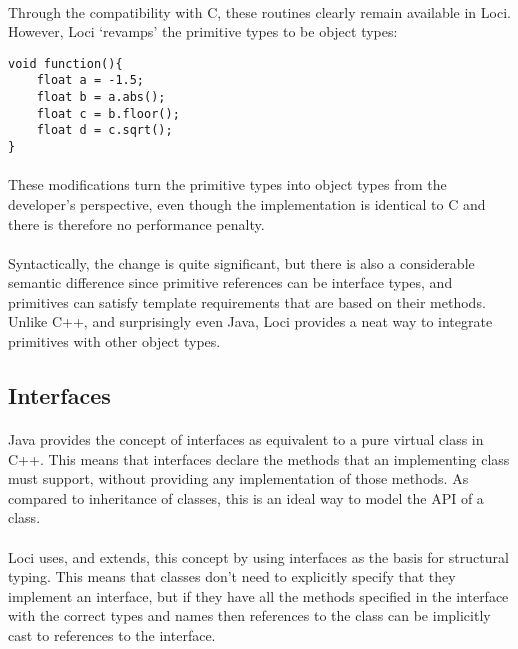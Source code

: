 \documentclass[12pt,twoside,notitlepage]{report}
\begin{document}
\paragraph{}
Through the compatibility with C, these routines clearly remain available in Loci. However, Loci `revamps' the primitive types to be object types:


\begin{lstlisting}
void function(){
	float a = -1.5;
	float b = a.abs();
	float c = b.floor();
	float d = c.sqrt();
}
\end{lstlisting}


\paragraph{}
These modifications turn the primitive types into object types from the developer's perspective, even though the implementation is identical to C and there is therefore no performance penalty.

\paragraph{}
Syntactically, the change is quite significant, but there is also a considerable semantic difference since primitive references can be interface types, and primitives can satisfy template requirements that are based on their methods. Unlike C++, and surprisingly even Java, Loci provides a neat way to integrate primitives with other object types.

\clearpage

\subsection{Interfaces}

\paragraph{}
Java provides the concept of interfaces as equivalent to a pure virtual class in C++. This means that interfaces declare the methods that an implementing class must support, without providing any implementation of those methods. As compared to inheritance of classes, this is an ideal way to model the API of a class.

\paragraph{}
Loci uses, and extends, this concept by using interfaces as the basis for structural typing. This means that classes don't need to explicitly specify that they implement an interface, but if they have all the methods specified in the interface with the correct types and names then references to the class can be implicitly cast to references to the interface.
\end{document}
